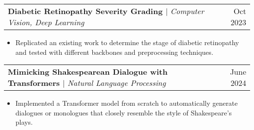 \documentclass[letterpaper,11pt]{article}
\makeatletter
\newcommand{\resumeItem}[1]{
  \item\small{
    {#1 \vspace{-2pt}}
  }
}
\newcommand{\resumeProjectHeading}[2]{
    \item
    \begin{tabular*}{0.97\textwidth}{l@{\extracolsep{\fill}}r}
      \small#1 & #2 \\
    \end{tabular*}\vspace{-7pt}
}
\newcommand{\resumeItemListStart}{\begin{itemize}}
\newcommand{\resumeItemListEnd}{\end{itemize}\vspace{-5pt}}
\makeatother
\begin{document}
        \resumeProjectHeading
        {\textbf{Diabetic Retinopathy Severity Grading {\href{https://drive.google.com/file/d/19k5OUWShbACEiaVxTCsiLiRc2OW6bonW/view?usp=sharing}{\faIcon{external-link-square-alt}}}} $|$ \footnotesize\emph{Computer Vision, Deep Learning}}{Oct 2023}
        \resumeItemListStart
            \vspace{2pt}
            \resumeItem{Replicated an existing work to determine the stage of diabetic retinopathy and tested with different backbones and preprocessing techniques.}
            
        \resumeItemListEnd

        \resumeProjectHeading
        {\textbf{Mimicking Shakespearean Dialogue with Transformers {\href{https://github.com/SasiniWanigathunga/Transformers.git}{\faIcon{external-link-square-alt}}}} $|$ \footnotesize\emph{Natural Language Processing}}{June 2024}
        \resumeItemListStart
            \vspace{2pt}
            \resumeItem{Implemented a Transformer model from scratch to automatically generate dialogues or monologues that closely resemble the style of Shakespeare's plays.}
        \resumeItemListEnd


            
\end{document}
